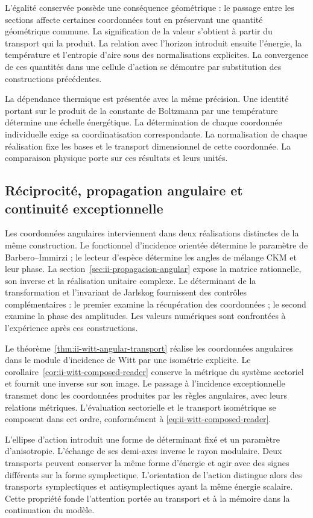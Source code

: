 L'égalité conservée possède une conséquence géométrique : le passage entre les sections affecte certaines coordonnées tout en préservant une quantité géométrique commune. La signification de la valeur s'obtient à partir du transport qui la produit. La relation avec l'horizon introduit ensuite l'énergie, la température et l'entropie d'aire sous des normalisations explicites. La convergence de ces quantités dans une cellule d'action se démontre par substitution des constructions précédentes.

La dépendance thermique est présentée avec la même précision. Une identité portant sur le produit de la constante de Boltzmann par une température détermine une échelle énergétique. La détermination de chaque coordonnée individuelle exige sa coordinatisation correspondante. La normalisation de chaque réalisation fixe les bases et le transport dimensionnel de cette coordonnée. La comparaison physique porte sur ces résultats et leurs unités.

\subsection{Réciprocité, propagation angulaire et continuité exceptionnelle}

Les coordonnées angulaires interviennent dans deux réalisations distinctes
de la même construction. Le fonctionnel d'incidence orientée détermine
le paramètre de Barbero--Immirzi ; le lecteur d'espèce détermine les
angles de mélange CKM et leur phase. La section~\ref{sec:ii-propagacion-angular}
expose la matrice rationnelle, son inverse et la réalisation unitaire complexe.
Le déterminant de la transformation et l'invariant de Jarlskog
fournissent des contrôles complémentaires : le premier examine la récupération
des coordonnées ; le second examine la phase des amplitudes. Les
valeurs numériques sont confrontées à l'expérience après ces constructions.

Le théorème~\ref{thm:ii-witt-angular-transport} réalise les coordonnées
angulaires dans le module d'incidence de Witt par une isométrie
explicite. Le corollaire~\ref{cor:ii-witt-composed-reader} conserve la
métrique du système sectoriel et fournit une inverse sur son image.
Le passage à l'incidence exceptionnelle transmet donc les coordonnées
produites par les règles angulaires, avec leurs relations métriques.
L'évaluation sectorielle et le transport isométrique se composent dans cet
ordre, conformément à \eqref{eq:ii-witt-composed-reader}.

L'ellipse d'action introduit une forme de déterminant fixé et un paramètre d'anisotropie. L'échange de ses demi-axes inverse le rayon modulaire. Deux transports peuvent conserver la même forme d'énergie et agir avec des signes différents sur la forme symplectique. L'orientation de l'action distingue alors des transports symplectiques et antisymplectiques ayant la même énergie scalaire. Cette propriété fonde l'attention portée au transport et à la mémoire dans la continuation du modèle.

